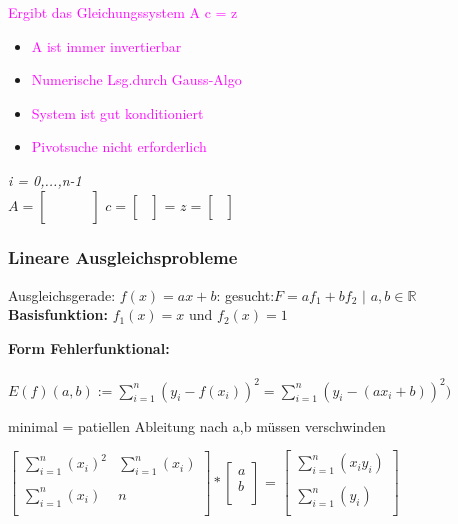 \documentclass[../ZF_HM2.tex]{subfiles}
\begin{document}
\textcolor {magenta}{ Ergibt das Gleichungssystem \colorbox {yellow!30} {A} \colorbox {violet!30} {c} = \colorbox {orange!30} {z}}
\begin{itemize}
	\item \textcolor {magenta} {A ist immer invertierbar} 
	\item \textcolor {magenta} {Numerische Lsg.durch Gauss-Algo} 
	\item \textcolor {magenta} {System ist gut konditioniert} 
	\item \textcolor {magenta} {Pivotsuche nicht erforderlich} 
\end{itemize}
\textit{i = 0,...,n-1}\\
$A = $\colorbox {yellow!30}{$ \left[\begin {matrix} &  &  & \\ 
&  &  &\\
&  &  &\\
&  &  &\\
\end{matrix}\right]$} $c = $\colorbox {violet!30}{$ \left[\begin {matrix}  \\
\\
\\
\end{matrix}\right]$} = $z = $\colorbox {orange!30}{$ \left[\begin {matrix}  \\
\\
\\
\end{matrix}\right]$}


\subsubsection{Lineare Ausgleichsprobleme}
\colorbox {pink!30}{Ausgleichsgerade:} $f(x)=ax+b$:
\colorbox {pink!30} {gesucht:}$F=af_1+bf_2$ $|$ $a,b \in \mathbb{R}$
\textbf{Basisfunktion:} $f_1(x) = x$ und $f_2(x) = 1$
\begin{theorem}
	\textbf{Form Fehlerfunktional:\\\\}
	$E(f)(a,b):= \sum_{i=1}^{n}(y_i-f(x_i))^2 = \sum_{i=1}^{n}(y_i-(ax_i +b))^2 )$
	 
\end{theorem}
\colorbox {pink!30}{minimal = } patiellen Ableitung nach a,b müssen verschwinden

$ \left[\begin {matrix}\sum_{i=1}^{n}(x_i)^2 & \sum_{i=1}^{n}(x_i)\\\\
\sum_{i=1}^{n}(x_i)&n\\
\end{matrix}\right] *
 \left[\begin {matrix}a\\
b\\
\end{matrix}\right]$
=
$ \left[\begin {matrix}\sum_{i=1}^{n}(x_iy_i) \\\\
\sum_{i=1}^{n}(y_i)\\
\end{matrix}\right]$
\end{document}

